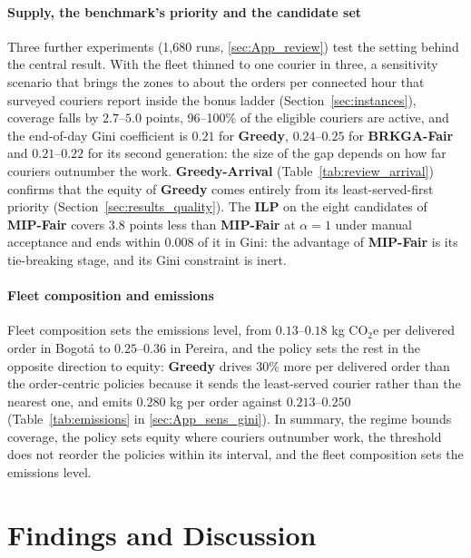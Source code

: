\documentclass[a4paper,11pt,review,3p,authoryear]{elsarticle}
\begin{document}
\paragraph{Supply, the benchmark's priority and the candidate set} Three further experiments (1{,}680 runs, \ref{sec:App_review}) test the setting behind the central result. With the fleet thinned to one courier in three, a sensitivity scenario that brings the zones to about the orders per connected hour that surveyed couriers report inside the bonus ladder (Section~\ref{sec:instances}), coverage falls by $2.7$--$5.0$ points, 96--100\% of the eligible couriers are active, and the end-of-day Gini coefficient is $0.21$ for \textbf{Greedy}, $0.24$--$0.25$ for \textbf{BRKGA-Fair} and $0.21$--$0.22$ for its second generation: the size of the gap depends on how far couriers outnumber the work. \textbf{Greedy-Arrival} (Table~\ref{tab:review_arrival}) confirms that the equity of \textbf{Greedy} comes entirely from its least-served-first priority (Section~\ref{sec:results_quality}). The \textbf{ILP} on the eight candidates of \textbf{MIP-Fair} covers $3.8$ points less than \textbf{MIP-Fair} at $\alpha = 1$ under manual acceptance and ends within $0.008$ of it in Gini: the advantage of \textbf{MIP-Fair} is its tie-breaking stage, and its Gini constraint is inert.

\paragraph{Fleet composition and emissions} Fleet composition sets the emissions level, from $0.13$--$0.18$ kg CO$_2$e per delivered order in Bogot\'a to $0.25$--$0.36$ in Pereira, and the policy sets the rest in the opposite direction to equity: \textbf{Greedy} drives 30\% more per delivered order than the order-centric policies because it sends the least-served courier rather than the nearest one, and emits $0.280$ kg per order against $0.213$--$0.250$ (Table~\ref{tab:emissions} in \ref{sec:App_sens_gini}). In summary, the regime bounds coverage, the policy sets equity where couriers outnumber work, the threshold does not reorder the policies within its interval, and the fleet composition sets the emissions level.

\section{Findings and Discussion}
\label{sec:findings_discussion}
\end{document}
